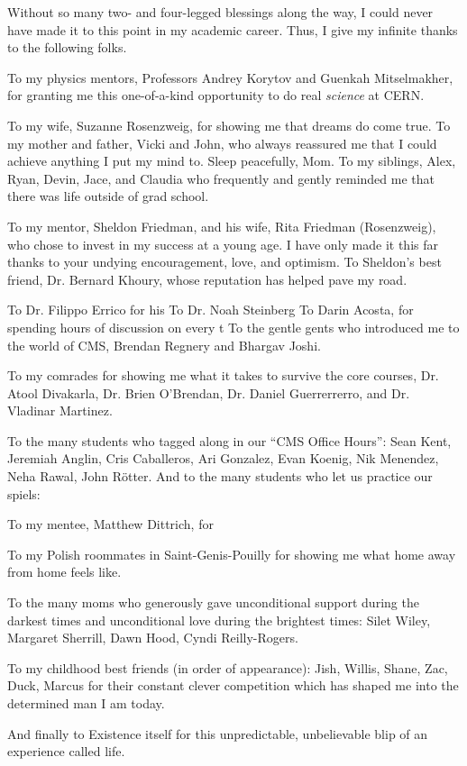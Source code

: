 Without so many two- and four-legged blessings along the way, I could never have made it to this point in my academic career.
Thus, I give my infinite thanks to the following folks.

To my physics mentors, Professors Andrey Korytov and Guenkah Mitselmakher, for granting me this one-of-a-kind opportunity to do real \emph{science} at CERN.

To my wife, Suzanne Rosenzweig, for showing me that dreams do come true.
To my mother and father, Vicki and John, who always reassured me that I could achieve anything I put my mind to. Sleep peacefully, Mom.
To my siblings, Alex, Ryan, Devin, Jace, and Claudia who frequently and gently reminded me that there was life outside of grad school.

To my mentor, Sheldon Friedman, and his wife, Rita Friedman (Rosenzweig), who chose to invest in my success at a young age.
I have only made it this far thanks to your undying encouragement, love, and optimism.
To Sheldon's best friend, Dr. Bernard Khoury, whose reputation has helped pave my road.

To Dr. Filippo Errico for his 
To Dr. Noah Steinberg
To Darin Acosta, for spending hours of discussion on every t
To the gentle gents who introduced me to the world of CMS, Brendan Regnery and Bhargav Joshi.

To my comrades for showing me what it takes to survive the core courses,
Dr. Atool Divakarla, Dr. Brien O'Brendan, Dr. Daniel Guerrerrerro, and Dr. Vladinar Martinez.

To the many students who tagged along in our ``CMS Office Hours'':
Sean Kent, Jeremiah Anglin, Cris Caballeros, Ari Gonzalez, 
Evan Koenig, Nik Menendez, Neha Rawal, John Rötter.
And to the many students who let us practice our spiels:


To my mentee, Matthew Dittrich, for 

To my Polish roommates in Saint-Genis-Pouilly for showing me what home away from home feels like.

To the many moms who generously gave unconditional support during the darkest times and unconditional love during the brightest times:
Silet Wiley, Margaret Sherrill, Dawn Hood, Cyndi Reilly-Rogers.

To my childhood best friends (in order of appearance):
Jish, Willis, Shane, Zac, Duck, Marcus for their constant clever competition which has shaped me into the determined man I am today.

And finally to Existence itself for this unpredictable, unbelievable blip of an experience called life.
